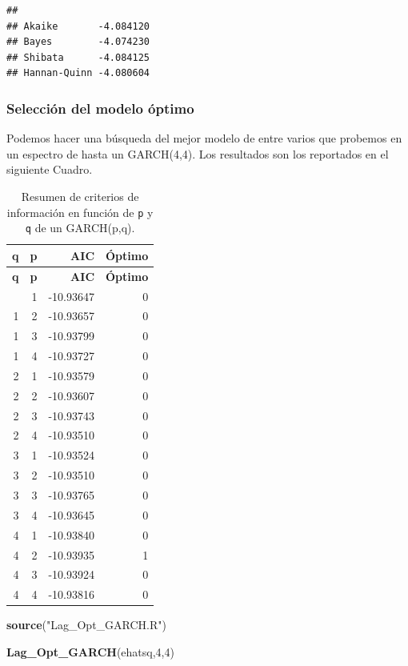 \documentclass[
]{book}
\newenvironment{Shaded}{\begin{snugshade}}{\end{snugshade}}
\newcommand{\DecValTok}[1]{\textcolor[rgb]{0.00,0.00,0.81}{#1}}
\newcommand{\FunctionTok}[1]{\textcolor[rgb]{0.13,0.29,0.53}{\textbf{#1}}}
\newcommand{\NormalTok}[1]{#1}
\newcommand{\StringTok}[1]{\textcolor[rgb]{0.31,0.60,0.02}{#1}}
\begin{document}
\begin{verbatim}
##                       
## Akaike       -4.084120
## Bayes        -4.074230
## Shibata      -4.084125
## Hannan-Quinn -4.080604
\end{verbatim}

\hypertarget{selecciuxf3n-del-modelo-uxf3ptimo}{%
\subsubsection{Selección del modelo óptimo}\label{selecciuxf3n-del-modelo-uxf3ptimo}}

Podemos hacer una búsqueda del mejor modelo de entre varios que probemos en un espectro de hasta un GARCH(4,4). Los resultados son los reportados en el siguiente Cuadro.

\begin{longtable}[]{@{}rrrr@{}}
\caption{\label{tab:criterios} Resumen de criterios de información en función de \texttt{p} y \texttt{q} de un GARCH(p,q).}\tabularnewline
\toprule\noalign{}
\textbf{q} & \textbf{p} & \textbf{AIC} & \textbf{Óptimo} \\
\midrule\noalign{}
\endfirsthead
\toprule\noalign{}
\textbf{q} & \textbf{p} & \textbf{AIC} & \textbf{Óptimo} \\
\midrule\noalign{}
\endhead
\bottomrule\noalign{}
\endlastfoot
1 & 1 & -10.93647 & 0 \\
1 & 2 & -10.93657 & 0 \\
1 & 3 & -10.93799 & 0 \\
1 & 4 & -10.93727 & 0 \\
2 & 1 & -10.93579 & 0 \\
2 & 2 & -10.93607 & 0 \\
2 & 3 & -10.93743 & 0 \\
2 & 4 & -10.93510 & 0 \\
3 & 1 & -10.93524 & 0 \\
3 & 2 & -10.93510 & 0 \\
3 & 3 & -10.93765 & 0 \\
3 & 4 & -10.93645 & 0 \\
4 & 1 & -10.93840 & 0 \\
4 & 2 & -10.93935 & 1 \\
4 & 3 & -10.93924 & 0 \\
4 & 4 & -10.93816 & 0 \\
\end{longtable}

\begin{Shaded}
\begin{Highlighting}[]
\FunctionTok{source}\NormalTok{(}\StringTok{"Lag\_Opt\_GARCH.R"}\NormalTok{)}

\FunctionTok{Lag\_Opt\_GARCH}\NormalTok{(ehatsq,}\DecValTok{4}\NormalTok{,}\DecValTok{4}\NormalTok{)}
\end{Highlighting}
\end{Shaded}
\end{document}
